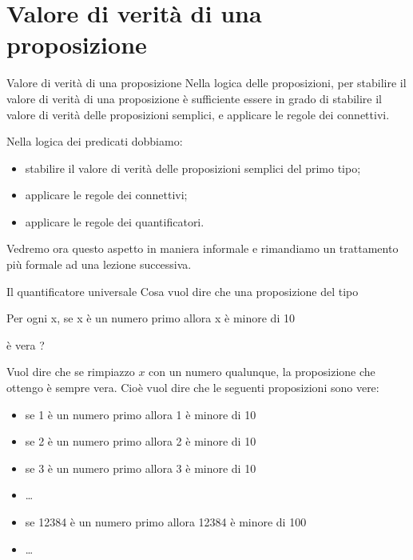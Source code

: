 \documentclass[aspectratio=169,10pt,dvipsnames]{beamer}
\begin{document}
\fi

\section{Valore di verità di una proposizione}

\begin{frame}{Valore di verità di una proposizione}
	Nella logica delle proposizioni, per stabilire il valore di verità di una proposizione è sufficiente essere in grado di stabilire il valore di verità delle proposizioni semplici, e applicare le regole dei connettivi.

	\pause\medskip
	Nella logica dei predicati dobbiamo:
	\begin{itemize}
		\item stabilire il valore di verità delle proposizioni semplici del primo tipo;
		\item applicare le regole dei connettivi;
		\item applicare le regole dei quantificatori.
	\end{itemize}

	\pause\medskip
	Vedremo ora questo aspetto in maniera informale e rimandiamo un trattamento più formale ad una lezione successiva.
\end{frame}

\begin{frame}{Il quantificatore universale}
	Cosa vuol dire che una proposizione del tipo
	\begin{center}
		Per ogni x, se x è un numero primo allora x è minore di 10
	\end{center}
	è vera ?

	\pause\medskip
	Vuol dire che se rimpiazzo $x$ con un numero qualunque, la proposizione che ottengo è sempre vera. Cioè vuol dire che le seguenti proposizioni sono vere:
	\begin{itemize}
		\item se 1 è un numero primo allora 1 è minore di 10
		\item se 2 è un numero primo allora 2 è minore di 10
		\item se 3 è un numero primo allora 3 è minore di 10
		\item \ldots
		\item se 12384 è un numero primo allora 12384 è minore di 100
		\item \ldots
	\end{itemize}
\end{frame}
\end{document}
